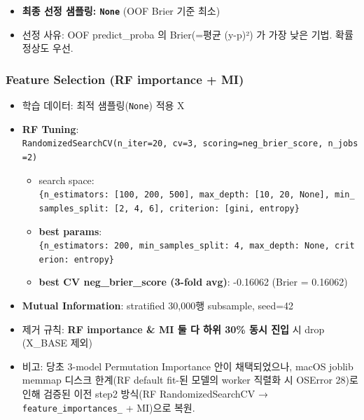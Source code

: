 \documentclass[
  11.5pt,
]{article}
\providecommand{\tightlist}{%
  \setlength{\itemsep}{0pt}\setlength{\parskip}{0pt}}
\begin{document}
\begin{itemize}
\tightlist
\item
  \textbf{최종 선정 샘플링: \texttt{None}} (OOF Brier 기준 최소)
\item
  선정 사유: OOF predict\_proba 의 Brier(=평균 (y-p)²) 가 가장 낮은
  기법. 확률 정상도 우선.
\end{itemize}

\subsubsection{Feature Selection (RF importance +
MI)}\label{feature-selection-rf-importance-mi}

\begin{itemize}
\tightlist
\item
  학습 데이터: 최적 샘플링(\texttt{None}) 적용 X
\item
  \textbf{RF Tuning}:
  \texttt{RandomizedSearchCV(n\_iter=20,\ cv=3,\ scoring=\textquotesingle{}neg\_brier\_score\textquotesingle{},\ n\_jobs=2)}

  \begin{itemize}
  \tightlist
  \item
    search space:
    \texttt{\{\textquotesingle{}n\_estimators\textquotesingle{}:\ {[}100,\ 200,\ 500{]},\ \textquotesingle{}max\_depth\textquotesingle{}:\ {[}10,\ 20,\ None{]},\ \textquotesingle{}min\_samples\_split\textquotesingle{}:\ {[}2,\ 4,\ 6{]},\ \textquotesingle{}criterion\textquotesingle{}:\ {[}\textquotesingle{}gini\textquotesingle{},\ \textquotesingle{}entropy\textquotesingle{}{]}\}}
  \item
    \textbf{best params}:
    \texttt{\{\textquotesingle{}n\_estimators\textquotesingle{}:\ 200,\ \textquotesingle{}min\_samples\_split\textquotesingle{}:\ 4,\ \textquotesingle{}max\_depth\textquotesingle{}:\ None,\ \textquotesingle{}criterion\textquotesingle{}:\ \textquotesingle{}entropy\textquotesingle{}\}}
  \item
    \textbf{best CV neg\_brier\_score (3-fold avg)}: -0.16062 (Brier =
    0.16062)
  \end{itemize}
\item
  \textbf{Mutual Information}: stratified 30,000행 subsample, seed=42
\item
  제거 규칙: \textbf{RF importance \& MI 둘 다 하위 30\% 동시 진입} 시
  drop (X\_BASE 제외)
\item
  비고: 당초 3-model Permutation Importance 안이 채택되었으나, macOS
  joblib memmap 디스크 한계(RF default fit-된 모델의 worker 직렬화 시
  OSError 28)로 인해 검증된 이전 step2 방식(RF RandomizedSearchCV →
  \texttt{feature\_importances\_} + MI)으로 복원.
\end{itemize}
\end{document}
